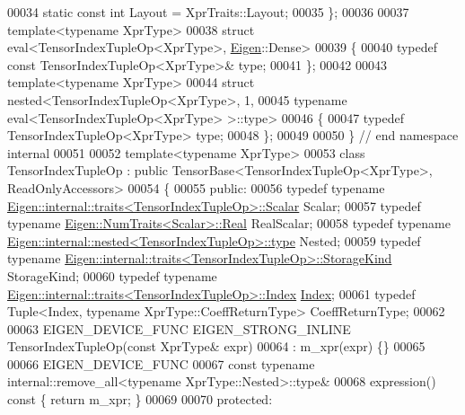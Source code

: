 \begin{DoxyCode}
00034   \textcolor{keyword}{static} \textcolor{keyword}{const} \textcolor{keywordtype}{int} Layout = XprTraits::Layout;
00035 \};
00036 
00037 \textcolor{keyword}{template}<\textcolor{keyword}{typename} XprType>
00038 \textcolor{keyword}{struct }eval<TensorIndexTupleOp<XprType>, \hyperlink{namespace_eigen}{Eigen}::Dense>
00039 \{
00040   \textcolor{keyword}{typedef} \textcolor{keyword}{const} TensorIndexTupleOp<XprType>& type;
00041 \};
00042 
00043 \textcolor{keyword}{template}<\textcolor{keyword}{typename} XprType>
00044 \textcolor{keyword}{struct }nested<TensorIndexTupleOp<XprType>, 1,
00045               typename eval<TensorIndexTupleOp<XprType> >::type>
00046 \{
00047   \textcolor{keyword}{typedef} TensorIndexTupleOp<XprType> type;
00048 \};
00049 
00050 \}  \textcolor{comment}{// end namespace internal}
00051 
00052 \textcolor{keyword}{template}<\textcolor{keyword}{typename} XprType>
00053 \textcolor{keyword}{class }TensorIndexTupleOp : \textcolor{keyword}{public} TensorBase<TensorIndexTupleOp<XprType>, ReadOnlyAccessors>
00054 \{
00055   \textcolor{keyword}{public}:
00056   \textcolor{keyword}{typedef} \textcolor{keyword}{typename} \hyperlink{struct_eigen_1_1internal_1_1traits}{Eigen::internal::traits<TensorIndexTupleOp>::Scalar}
       Scalar;
00057   \textcolor{keyword}{typedef} \textcolor{keyword}{typename} \hyperlink{group___sparse_core___module}{Eigen::NumTraits<Scalar>::Real} RealScalar;
00058   \textcolor{keyword}{typedef} \textcolor{keyword}{typename} \hyperlink{class_eigen_1_1internal_1_1_tensor_lazy_evaluator_writable}{Eigen::internal::nested<TensorIndexTupleOp>::type}
       Nested;
00059   \textcolor{keyword}{typedef} \textcolor{keyword}{typename} \hyperlink{struct_eigen_1_1internal_1_1traits}{Eigen::internal::traits<TensorIndexTupleOp>::StorageKind}
       StorageKind;
00060   \textcolor{keyword}{typedef} \textcolor{keyword}{typename} \hyperlink{struct_eigen_1_1internal_1_1traits}{Eigen::internal::traits<TensorIndexTupleOp>::Index}
       \hyperlink{namespace_eigen_a62e77e0933482dafde8fe197d9a2cfde}{Index};
00061   \textcolor{keyword}{typedef} Tuple<Index, typename XprType::CoeffReturnType> CoeffReturnType;
00062 
00063   EIGEN\_DEVICE\_FUNC EIGEN\_STRONG\_INLINE TensorIndexTupleOp(\textcolor{keyword}{const} XprType& expr)
00064       : m\_xpr(expr) \{\}
00065 
00066   EIGEN\_DEVICE\_FUNC
00067   \textcolor{keyword}{const} \textcolor{keyword}{typename} internal::remove\_all<typename XprType::Nested>::type&
00068   expression()\textcolor{keyword}{ const }\{ \textcolor{keywordflow}{return} m\_xpr; \}
00069 
00070   \textcolor{keyword}{protected}:

\end{DoxyCode}
